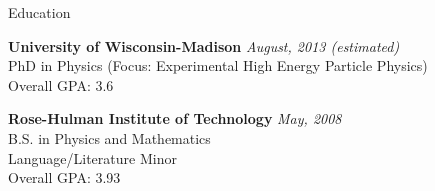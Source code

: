 \documentclass{resume} %
\begin{document}






\begin{rSection}{Education}

{\bf University of Wisconsin-Madison} \hfill {\em August, 2013 (estimated)} \\ 
\/PhD in Physics (Focus: Experimental High Energy Particle Physics) \\
Overall GPA: 3.6

{\bf Rose-Hulman Institute of Technology} \hfill {\em May, 2008} \\
B.S. in Physics and Mathematics\\
Language/Literature Minor\\
Overall GPA: 3.93
\end{rSection}

\end{document}
